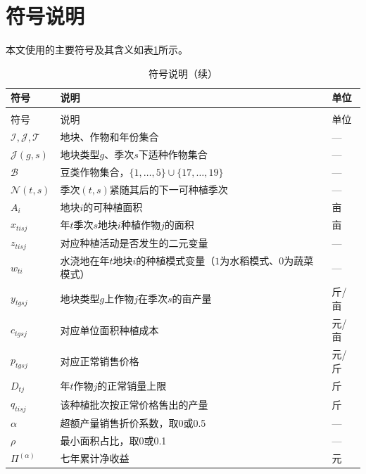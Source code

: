 
\section{符号说明}

本文使用的主要符号及其含义如表\ref{tab:符号说明}所示。

\begin{longtable}{
    >{\centering\arraybackslash}p{}
    >{\centering\arraybackslash}p{}
    >{\centering\arraybackslash}p{}
  }
  \caption{符号说明}
  \label{tab:符号说明} \\
  \toprule
  符号 & 说明 & 单位 \\
  \midrule
  \endfirsthead
  \caption{符号说明（续）} \\
  \toprule
  符号 & 说明 & 单位 \\
  \midrule
  \endhead
  \bottomrule
  \endfoot
  $\mathcal I,\mathcal J,\mathcal T$ & 地块、作物和年份集合 & --- \\
  $\mathcal J(g,s)$ & 地块类型$g$、季次$s$下适种作物集合 & --- \\
  $\mathcal B$ & 豆类作物集合，$\{1,\dots,5\}\cup\{17,\dots,19\}$ & --- \\
  $\mathcal N(t,s)$ & 季次$(t,s)$紧随其后的下一可种植季次 & --- \\
  $A_i$ & 地块$i$的可种植面积 & 亩 \\
  $x_{tisj}$ & 年$t$季次$s$地块$i$种植作物$j$的面积 & 亩 \\
  $z_{tisj}$ & 对应种植活动是否发生的二元变量 & --- \\
  $w_{ti}$ & 水浇地在年$t$地块$i$的种植模式变量（$1$为水稻模式、$0$为蔬菜模式） & --- \\
  $y_{tgsj}$ & 地块类型$g$上作物$j$在季次$s$的亩产量 & 斤/亩 \\
  $c_{tgsj}$ & 对应单位面积种植成本 & 元/亩 \\
  $p_{tgsj}$ & 对应正常销售价格 & 元/斤 \\
  $D_{tj}$ & 年$t$作物$j$的正常销量上限 & 斤 \\
  $q_{tisj}$ & 该种植批次按正常价格售出的产量 & 斤 \\
  $\alpha$ & 超额产量销售折价系数，取0或0.5 & --- \\
  $\rho$ & 最小面积占比，取0或0.1 & --- \\
  $\Pi^{(\alpha)}$ & 七年累计净收益 & 元 \\

\end{longtable}
